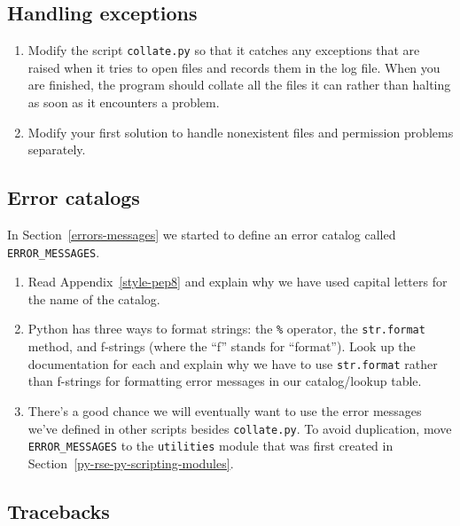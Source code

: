 \documentclass[
]{krantz}
\providecommand{\tightlist}{%
  \setlength{\itemsep}{0pt}\setlength{\parskip}{0pt}}
\begin{document}
\hypertarget{errors-ex-exceptions}{%
\subsection{Handling exceptions}\label{errors-ex-exceptions}}

\begin{enumerate}
\def\labelenumi{\arabic{enumi}.}
\tightlist
\item
  Modify the script \texttt{collate.py} so that it catches any exceptions
  that are raised when it tries to open files
  and records them in the log file.
  When you are finished,
  the program should collate all the files it can
  rather than halting as soon as it encounters a problem.
\item
  Modify your first solution to handle nonexistent files
  and permission problems separately.
\end{enumerate}

\hypertarget{errors-ex-catalog}{%
\subsection{Error catalogs}\label{errors-ex-catalog}}

In Section~\ref{errors-messages} we started to define an error catalog called \texttt{ERROR\_MESSAGES}.

\begin{enumerate}
\def\labelenumi{\arabic{enumi}.}
\tightlist
\item
  Read Appendix~\ref{style-pep8} and explain why we have used capital letters
  for the name of the catalog.
\item
  Python has three ways to format strings:
  the \texttt{\%} operator, the \texttt{str.format} method, and f-strings (where the ``f'' stands for ``format'').
  Look up the documentation for each
  and explain why we have to use \texttt{str.format} rather than f-strings
  for formatting error messages in our catalog/lookup table.
\item
  There's a good chance we will eventually want to use the error messages we've defined
  in other scripts besides \texttt{collate.py}.
  To avoid duplication,
  move \texttt{ERROR\_MESSAGES} to the \texttt{utilities} module that was first created in
  Section~\ref{py-rse-py-scripting-modules}.
\end{enumerate}

\hypertarget{errors-ex-traceback}{%
\subsection{Tracebacks}\label{errors-ex-traceback}}
\end{document}
